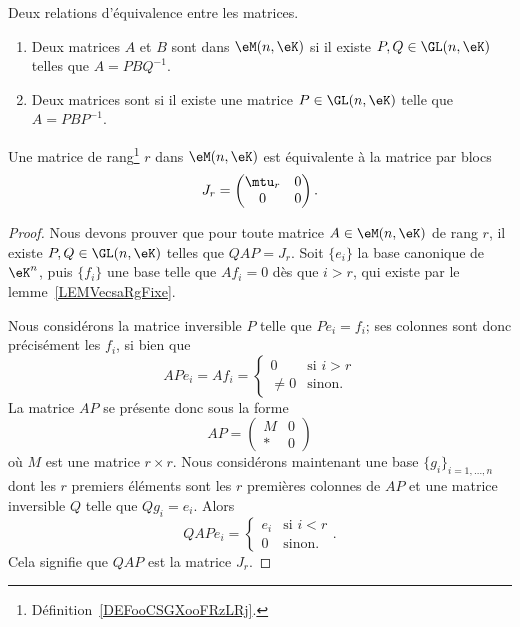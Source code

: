 \begin{definition}  \label{DefBLELooTvlHoB}
	Deux relations d'équivalence entre les matrices.
	\begin{enumerate}
		\item   \label{ItemPFXCooOUbSCt}
		      Deux matrices \( A\) et \( B\) sont  dans \( \eM(n,\eK)\) si il existe \( P,Q\in\GL(n,\eK)\) telles que \( A=PBQ^{-1}\).
		\item
		      Deux matrices sont  si il existe une matrice \( P\in \GL(n,\eK)\) telle que \( A=PBP^{-1}\).
	\end{enumerate}
\end{definition}

\begin{lemma}   \label{LemZMxxnfM}
	Une matrice de rang\footnote{Définition~\ref{DEFooCSGXooFRzLRj}.} \( r\) dans \( \eM(n,\eK)\) est équivalente à la matrice par blocs
	\begin{equation}
		J_r=\begin{pmatrix}
			\mtu_r & 0 \\
			0      & 0
		\end{pmatrix}.
	\end{equation}
\end{lemma}

\begin{proof}
	Nous devons prouver que pour toute matrice \( A\in\eM(n,\eK)\) de rang \( r\), il existe \( P,Q\in\GL(n,\eK)\) telles que \(QAP=J_r\). Soit \( \{ e_i \}\) la base canonique de \( \eK^n\), puis \( \{ f_i \}\) une base telle que \( Af_i=0\) dès que \( i>r\), qui existe par le lemme~\ref{LEMVecsaRgFixe}.

	Nous considérons la matrice inversible \( P\) telle que \( Pe_i=f_i\); ses colonnes sont donc précisément les \( f_i \), si bien que
	\begin{equation}
		APe_i=Af_i=\begin{cases}
			0      & \text{si } i>r \\
			\neq 0 & \text{sinon}.
		\end{cases}
	\end{equation}
	La matrice \( AP\) se présente donc sous la forme
	\begin{equation}
		AP=\begin{pmatrix}
			M & 0 \\
			* & 0
		\end{pmatrix}
	\end{equation}
	où \( M\) est une matrice \( r\times r\). Nous considérons maintenant une base \( \{ g_i \}_{i=1,\ldots, n}\) dont les \( r\) premiers éléments sont les \( r\) premières colonnes de \( AP\) et une matrice inversible \( Q\) telle que \( Qg_i=e_i\). Alors
	\begin{equation}
		QAPe_i=\begin{cases}
			e_i & \text{si } i<r \\
			0   & \text{sinon}.
		\end{cases}.
	\end{equation}
	Cela signifie que \( QAP\) est la matrice \( J_r\).
\end{proof}

